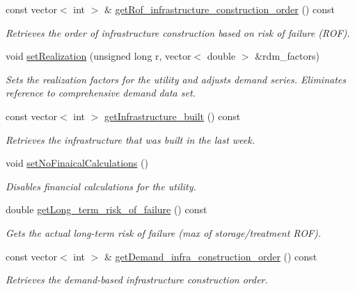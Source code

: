 \begin{DoxyCompactItemize}
const vector$<$ int $>$ \& \mbox{\hyperlink{classUtility_a446e46d3dac749121db6cb839acf28dd}{get\+Rof\+\_\+infrastructure\+\_\+construction\+\_\+order}} () const
\begin{DoxyCompactList}\small\item\em Retrieves the order of infrastructure construction based on risk of failure (R\+OF). \end{DoxyCompactList}\item 
void \mbox{\hyperlink{classUtility_a2d41989b4154aed5c2fb99a27183ca34}{set\+Realization}} (unsigned long r, vector$<$ double $>$ \&rdm\+\_\+factors)
\begin{DoxyCompactList}\small\item\em Sets the realization factors for the utility and adjusts demand series. Eliminates reference to comprehensive demand data set. \end{DoxyCompactList}\item 
const vector$<$ int $>$ \mbox{\hyperlink{classUtility_abe05c15d0ea2efec00c00a8ee418b53b}{get\+Infrastructure\+\_\+built}} () const
\begin{DoxyCompactList}\small\item\em Retrieves the infrastructure that was built in the last week. \end{DoxyCompactList}\item 
void \mbox{\hyperlink{classUtility_a6a89bff2044b4f68714ce9934344e2ad}{set\+No\+Finaical\+Calculations}} ()
\begin{DoxyCompactList}\small\item\em Disables financial calculations for the utility. \end{DoxyCompactList}\item 
double \mbox{\hyperlink{classUtility_a6ac587bf46d7147f9722dc4c89abbb3b}{get\+Long\+\_\+term\+\_\+risk\+\_\+of\+\_\+failure}} () const
\begin{DoxyCompactList}\small\item\em Gets the actual long-\/term risk of failure (max of storage/treatment R\+OF). \end{DoxyCompactList}\item 
const vector$<$ int $>$ \& \mbox{\hyperlink{classUtility_ab62d06b45773fb9e5574a339ac0c449e}{get\+Demand\+\_\+infra\+\_\+construction\+\_\+order}} () const
\begin{DoxyCompactList}\small\item\em Retrieves the demand-\/based infrastructure construction order. \end{DoxyCompactList}\item 

\end{DoxyCompactItemize}

